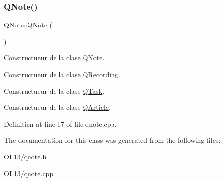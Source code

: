 \subsubsection{\texorpdfstring{Q\+Note()}{QNote()}}
{\footnotesize\ttfamily Q\+Note\+::\+Q\+Note (\begin{DoxyParamCaption}{ }\end{DoxyParamCaption})}



Constructueur de la clase \hyperlink{class_q_note}{Q\+Note}. 

Constructueur de la clase \hyperlink{class_q_recording}{Q\+Recording}.

Constructueur de la clase \hyperlink{class_q_task}{Q\+Task}.

Constructueur de la clase \hyperlink{class_q_article}{Q\+Article}. 

Definition at line 17 of file qnote.\+cpp.



The documentation for this class was generated from the following files\+:\begin{DoxyCompactItemize}
\item 
O\+L13/\hyperlink{qnote_8h}{qnote.\+h}\item 
O\+L13/\hyperlink{qnote_8cpp}{qnote.\+cpp}\end{DoxyCompactItemize}
